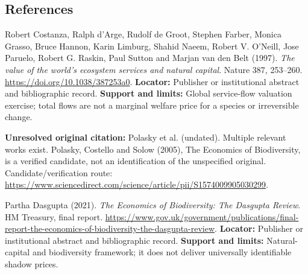 \documentclass[11pt,a4paper]{article}
\begin{document}
\subsection*{References}

\begin{enumerate}[label={[\textnormal{S}\arabic*]},leftmargin=*]

\item Robert Costanza, Ralph d’Arge, Rudolf de Groot, Stephen Farber, Monica Grasso, Bruce Hannon, Karin Limburg, Shahid Naeem, Robert V. O’Neill, Jose Paruelo, Robert G. Raskin, Paul Sutton and Marjan van den Belt (1997). \emph{The value of the world’s ecosystem services and natural capital}. Nature 387, 253–260. \url{https://doi.org/10.1038/387253a0}. \textbf{Locator:} Publisher or institutional abstract and bibliographic record. \textbf{Support and limits:} Global service-flow valuation exercise; total flows are not a marginal welfare price for a species or irreversible change.

\item \textbf{Unresolved original citation:} Polasky et al. (undated). Multiple relevant works exist. Polasky, Costello and Solow (2005), The Economics of Biodiversity, is a verified candidate, not an identification of the unspecified original. Candidate/verification route: \url{https://www.sciencedirect.com/science/article/pii/S1574009905030299}.

\item Partha Dasgupta (2021). \emph{The Economics of Biodiversity: The Dasgupta Review}. HM Treasury, final report. \url{https://www.gov.uk/government/publications/final-report-the-economics-of-biodiversity-the-dasgupta-review}. \textbf{Locator:} Publisher or institutional abstract and bibliographic record. \textbf{Support and limits:} Natural-capital and biodiversity framework; it does not deliver universally identifiable shadow prices.

\end{enumerate}
\end{document}
